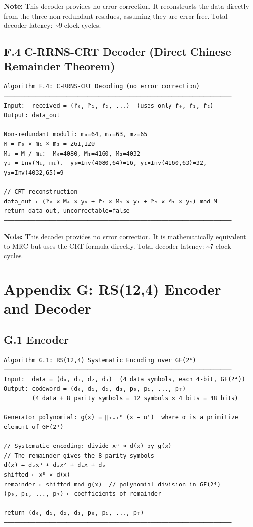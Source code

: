 \documentclass[
  english,
  12pt,
]{report}
\begin{document}
\textbf{Note:} This decoder provides no error correction. It
reconstructs the data directly from the three non-redundant residues,
assuming they are error-free. Total decoder latency: \textasciitilde9
clock cycles.

\subsection{F.4 C-RRNS-CRT Decoder (Direct Chinese Remainder
Theorem)}\label{f.4-c-rrns-crt-decoder-direct-chinese-remainder-theorem}

\begin{verbatim}
Algorithm F.4: C-RRNS-CRT Decoding (no error correction)
─────────────────────────────────────────────────────────────────
Input:  received = (r̃₀, r̃₁, r̃₂, ...)  (uses only r̃₀, r̃₁, r̃₂)
Output: data_out

Non-redundant moduli: m₀=64, m₁=63, m₂=65
M = m₀ × m₁ × m₂ = 261,120
Mᵢ = M / mᵢ:  M₀=4080, M₁=4160, M₂=4032
yᵢ = Inv(Mᵢ, mᵢ):  y₀=Inv(4080,64)=16, y₁=Inv(4160,63)=32, y₂=Inv(4032,65)=9

// CRT reconstruction
data_out ← (r̃₀ × M₀ × y₀ + r̃₁ × M₁ × y₁ + r̃₂ × M₂ × y₂) mod M
return data_out, uncorrectable=false
─────────────────────────────────────────────────────────────────
\end{verbatim}

\textbf{Note:} This decoder provides no error correction. It is
mathematically equivalent to MRC but uses the CRT formula directly.
Total decoder latency: \textasciitilde7 clock cycles.

\section{Appendix G: RS(12,4) Encoder and
Decoder}\label{appendix-g-rs124-encoder-and-decoder}

\subsection{G.1 Encoder}\label{g.1-encoder}

\begin{verbatim}
Algorithm G.1: RS(12,4) Systematic Encoding over GF(2⁴)
─────────────────────────────────────────────────────────────────
Input:  data = (d₀, d₁, d₂, d₃)  (4 data symbols, each 4-bit, GF(2⁴))
Output: codeword = (d₀, d₁, d₂, d₃, p₀, p₁, ..., p₇)
        (4 data + 8 parity symbols = 12 symbols × 4 bits = 48 bits)

Generator polynomial: g(x) = ∏ᵢ₌₁⁸ (x − αⁱ)  where α is a primitive element of GF(2⁴)

// Systematic encoding: divide x⁸ × d(x) by g(x)
// The remainder gives the 8 parity symbols
d(x) ← d₃x³ + d₂x² + d₁x + d₀
shifted ← x⁸ × d(x)
remainder ← shifted mod g(x)  // polynomial division in GF(2⁴)
(p₀, p₁, ..., p₇) ← coefficients of remainder

return (d₀, d₁, d₂, d₃, p₀, p₁, ..., p₇)
─────────────────────────────────────────────────────────────────
\end{verbatim}
\end{document}

